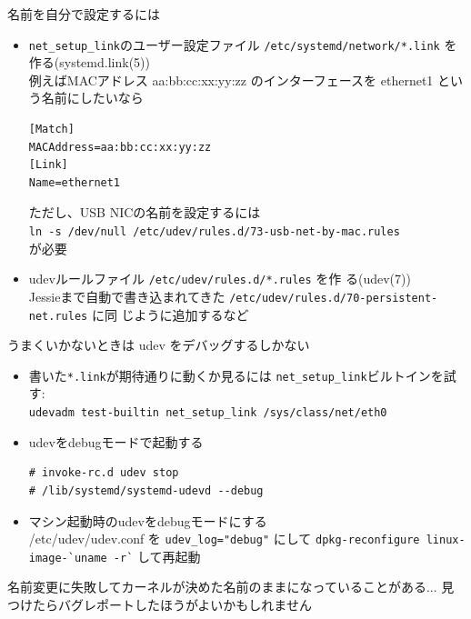 \begin{frame}[containsverbatim]{名前を自分で設定するには}
\begin{itemize}
 \item \texttt{net\_setup\_link}のユーザー設定ファイル {\small{\texttt{/etc/systemd/network/*.link}}}
       を作る(systemd.link(5))\\
       例えばMACアドレス aa:bb:cc:xx:yy:zz のインターフェースを ethernet1 という名前にしたいなら
       {\footnotesize
       \begin{verbatim}
[Match]
MACAddress=aa:bb:cc:xx:yy:zz
[Link]
Name=ethernet1
\end{verbatim}} ただし、USB NICの名前を設定するには\\
       {\footnotesize{\verb|ln -s /dev/null /etc/udev/rules.d/73-usb-net-by-mac.rules|}}\\
       が必要
 \item udevルールファイル {\small{\texttt{/etc/udev/rules.d/*.rules}}} を作
       る(udev(7))\\
       Jessieまで自動で書き込まれてきた 
       {\small{\texttt{/etc/udev/rules.d/70-persistent-net.rules}}} に同
       じように追加するなど
\end{itemize}
\end{frame}

\begin{frame}[containsverbatim]{うまくいかないときは}
 udev をデバッグするしかない
\begin{itemize}
 \item 書いた\texttt{*.link}が期待通りに動くか見るには {\small{\texttt{net\_setup\_link}}}ビルトインを試す:\\
       {\footnotesize{\verb|udevadm test-builtin net_setup_link /sys/class/net/eth0|}}
 \item udevをdebugモードで起動する
       {\footnotesize
       \begin{verbatim}
# invoke-rc.d udev stop
# /lib/systemd/systemd-udevd --debug
\end{verbatim}}
 \item マシン起動時のudevをdebugモードにする\\
       /etc/udev/udev.conf を {\small{\verb|udev_log="debug"|}} にして
       {\small{\verb|dpkg-reconfigure linux-image-`uname -r`|}}
       して再起動
\end{itemize}

 名前変更に失敗してカーネルが決めた名前のままになっていることがある...
 見つけたらバグレポートしたほうがよいかもしれません
\end{frame}

